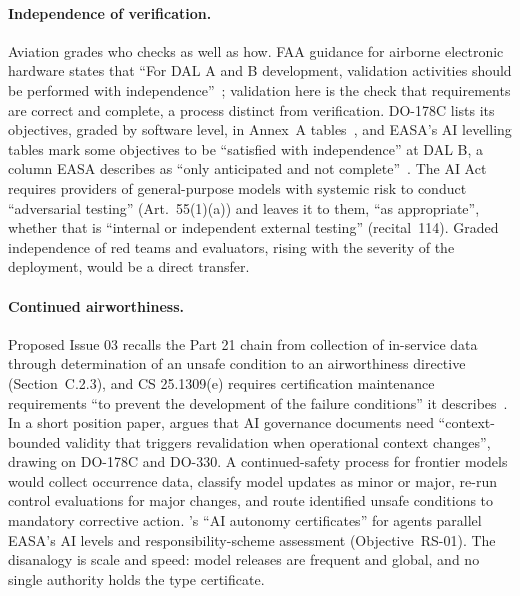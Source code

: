 \documentclass{aer}
\begin{document}
\paragraph{Independence of verification.} Aviation grades who checks as well as how. FAA guidance for airborne electronic hardware states that ``For DAL A and B development, validation activities should be performed with independence''~\citeyearpar[Section~5.5.1]{faa2022ac20152a}; validation here is the check that requirements are correct and complete, a process distinct from verification. DO-178C lists its objectives, graded by software level, in Annex~A tables~\citetext{\citealp[para.~6]{faa2017ac20115d}; \citealp{rtca2011do178c}}, and EASA's AI levelling tables mark some objectives to be ``satisfied with independence'' at DAL B, a column EASA describes as ``only anticipated and not complete''~\citeyearpar[Chapter~D]{easa2026concept}. The AI Act requires providers of general-purpose models with systemic risk to conduct ``adversarial testing'' (Art.~55(1)(a)) and leaves it to them, ``as appropriate'', whether that is ``internal or independent external testing'' (recital~114). Graded independence of red teams and evaluators, rising with the severity of the deployment, would be a direct transfer.

\paragraph{Continued airworthiness.} Proposed Issue 03 recalls the Part 21 chain from collection of in-service data through determination of an unsafe condition to an airworthiness directive (Section~C.2.3), and CS 25.1309(e) requires certification maintenance requirements ``to prevent the development of the failure conditions'' it describes~\citep{easa2020cs25}. In a short position paper, \citet{zietsman2026fifty} argues that AI governance documents need ``context-bounded validity that triggers revalidation when operational context changes'', drawing on DO-178C and DO-330. A continued-safety process for frontier models would collect occurrence data, classify model updates as minor or major, re-run control evaluations for major changes, and route identified unsafe conditions to mandatory corrective action. \citeauthor{feng2025levels}'s \citeyearpar{feng2025levels} ``AI autonomy certificates'' for agents parallel EASA's AI levels and responsibility-scheme assessment (Objective~RS-01). The disanalogy is scale and speed: model releases are frequent and global, and no single authority holds the type certificate.
\end{document}
